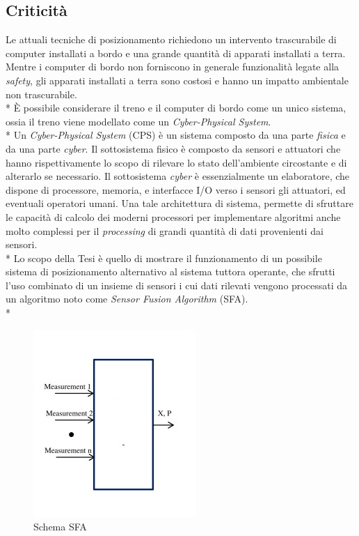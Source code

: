 \subsection{Criticit\`a}
Le attuali tecniche di posizionamento richiedono un intervento trascurabile di computer installati a bordo e una grande quantit\`a di apparati installati a terra. Mentre i computer di bordo non forniscono in generale funzionalit\`a legate alla \emph{safety}, gli apparati installati a terra sono costosi e hanno un impatto ambientale non trascurabile.\\*
\`E possibile considerare il treno e il computer di bordo come un unico sistema, ossia il treno viene modellato come un \emph{Cyber-Physical System}.\\*
Un \emph{Cyber-Physical System} (CPS) \`e un sistema composto da una parte \emph{fisica} e da una parte \emph{cyber}. Il sottosistema fisico \`e composto da sensori e attuatori che hanno rispettivamente lo scopo di rilevare lo stato dell'ambiente circostante e di alterarlo se necessario. Il sottosistema \emph{cyber} \`e essenzialmente un elaboratore, che dispone di processore, memoria, e interfacce I/O verso i sensori gli attuatori, ed eventuali operatori  umani. Una tale architettura di sistema, permette di sfruttare le capacit\`a di calcolo dei moderni processori per implementare algoritmi anche molto complessi per il \emph{processing} di grandi quantit\`a di dati provenienti dai sensori.\\*
Lo scopo della Tesi \`e quello di mostrare il funzionamento di un possibile sistema di posizionamento alternativo al sistema tuttora operante, che sfrutti l'uso combinato di un insieme di sensori i cui dati rilevati vengono processati da un algoritmo noto come \emph{Sensor Fusion Algorithm} (SFA).\\*
\begin{figure}[h]
	\centering
	\includegraphics{img/sfaschema}
	\caption{Schema SFA}
	\label{fig:sfa}
\end{figure}
